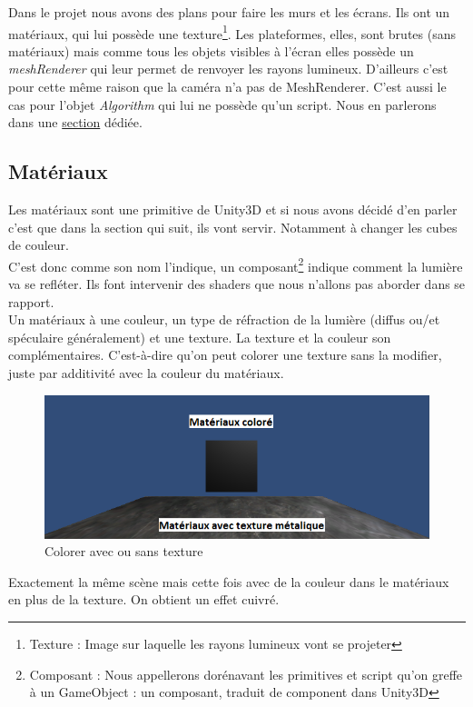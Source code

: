 \documentclass[a4paper,11pt]{myreport}
\begin{document}
	\par Dans le projet nous avons des plans pour faire les murs et les écrans. Ils ont un matériaux, qui lui possède une texture\footnote{Texture : Image sur laquelle les rayons lumineux vont se projeter}. Les plateformes, elles, sont brutes (sans matériaux) mais comme tous les objets visibles à l'écran elles possède un \textit{meshRenderer} qui leur permet de renvoyer les rayons lumineux. D'ailleurs c'est pour cette même raison que la caméra n'a pas de MeshRenderer. C'est aussi le cas pour l'objet \textit{Algorithm} qui lui ne possède qu'un script. Nous en parlerons dans une \hyperlink{prefabTarget}{section} dédiée.

	\subsection{Matériaux}
	\par Les matériaux sont une primitive de Unity3D et si nous avons décidé d'en parler c'est que dans la section qui suit, ils vont servir. Notamment à changer les cubes de couleur.\\
	C'est donc comme son nom l'indique, un composant\footnote{Composant : Nous appellerons dorénavant les primitives et script qu'on greffe à un GameObject : un composant, traduit de component dans Unity3D} indique comment la lumière va se refléter. Ils font intervenir des shaders que nous n'allons pas aborder dans se rapport.\\
	Un matériaux à une couleur, un type de réfraction de la lumière (diffus ou/et spéculaire généralement) et une texture. La texture et la couleur son complémentaires. C'est-à-dire qu'on peut colorer une texture sans la modifier, juste par additivité avec la couleur du matériaux.
	\begin{figure}[h]
	\includegraphics[scale=0.50]{./images/materiaux.png}
	\caption{Colorer avec ou sans texture}
	\end{figure}
	\par Exactement la même scène mais cette fois avec de la couleur dans le matériaux en plus de la texture. On obtient un effet cuivré.
\end{document}
